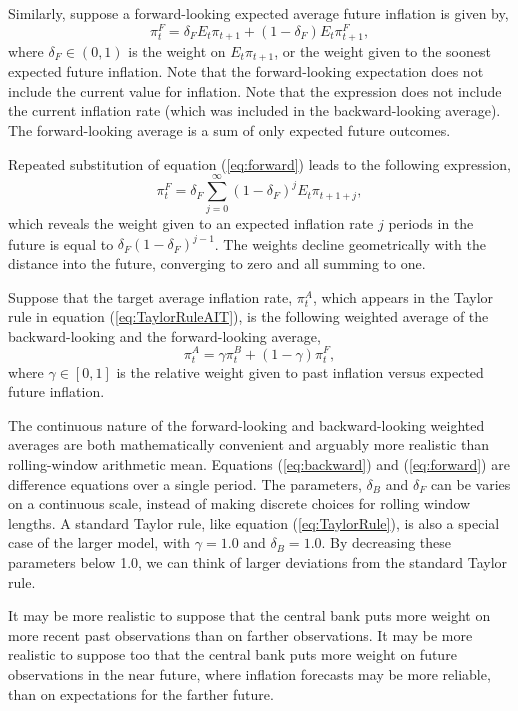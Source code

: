 \documentclass[12pt]{article}
\begin{document}
Similarly, suppose a forward-looking expected average future inflation is given by,
\begin{equation}\label{eq:forward}
  \pi_t^F = \delta_F E_t \pi_{t+1} + (1-\delta_F) E_t \pi_{t+1}^F,
\end{equation}
where $\delta_F \in (0,1)$ is the weight on $E_t \pi_{t+1}$, or the weight given to the soonest expected future inflation. Note that the forward-looking expectation does not include the current value for inflation. Note that the expression does not include the current inflation rate (which was included in the backward-looking average). The forward-looking average is a sum of only expected future outcomes.

Repeated substitution of equation (\ref{eq:forward}) leads to the following expression,
\begin{equation}\label{eq:forward_all}
  \pi_t^F = \delta_F \sum_{j=0}^{\infty} (1-\delta_F)^j E_t \pi_{t+1+j},
\end{equation}
which reveals the weight given to an expected inflation rate $j$ periods in the future is equal to $\delta_F (1-\delta_F)^{j-1}$. The weights decline geometrically with the distance into the future, converging to zero and all summing to one.

Suppose that the target average inflation rate, $\pi_t^A$, which appears in the Taylor rule in equation (\ref{eq:TaylorRuleAIT}), is the following weighted average of the backward-looking and the forward-looking average,
\begin{equation}
  \pi_t^A = \gamma \pi_t^B + (1-\gamma) \pi_t^F,
\end{equation}
where $\gamma \in [0,1]$ is the relative weight given to past inflation versus expected future inflation.

The continuous nature of the forward-looking and backward-looking weighted averages are both mathematically convenient and arguably more realistic than rolling-window arithmetic mean. Equations (\ref{eq:backward}) and (\ref{eq:forward}) are difference equations over a single period. The parameters, $\delta_B$ and $\delta_F$ can be varies on a continuous scale, instead of making discrete choices for rolling window lengths. A standard Taylor rule, like equation (\ref{eq:TaylorRule}), is also a special case of the larger model, with $\gamma=1.0$ and $\delta_B=1.0$. By decreasing these parameters below 1.0, we can think of larger deviations from the standard Taylor rule.

It may be more realistic to suppose that the central bank puts more weight on more recent past observations than on farther observations. It may be more realistic to suppose too that the central bank puts more weight on future observations in the near future, where inflation forecasts may be more reliable, than on expectations for the farther future.
\end{document}
